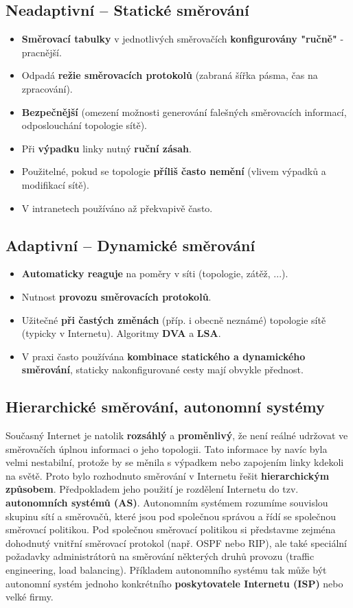 \subsection{Neadaptivní -- Statické směrování}
\begin{itemize}
    \item \textbf{Směrovací tabulky} v jednotlivých směrovačích \textbf{konfigurovány "ručně"} - pracnější.
    \item Odpadá \textbf{režie směrovacích protokolů} (zabraná šířka pásma, čas na zpracování).
    \item \textbf{Bezpečnější} (omezení možnosti generování falešných směrovacích informací, odposlouchání topologie sítě).
    \item Při \textbf{výpadku} linky nutný \textbf{ruční zásah}.
    \item Použitelné, pokud se topologie \textbf{příliš často nemění} (vlivem výpadků a modifikací sítě).
    \item V intranetech používáno až překvapivě často.
\end{itemize}

\subsection{Adaptivní -- Dynamické směrování}
\begin{itemize}
    \item \textbf{Automaticky reaguje} na poměry v síti (topologie, zátěž, ...).
    \item Nutnost\textbf{ provozu směrovacích protokolů}.
    \item Užitečné \textbf{při častých změnách} (příp. i obecně neznámé) topologie sítě (typicky v Internetu). Algoritmy \textbf{DVA} a \textbf{LSA}.
    \item V praxi často používána \textbf{kombinace statického a dynamického směrování}, staticky nakonfigurované cesty mají obvykle přednost.
\end{itemize}

\subsection{Hierarchické směrování, autonomní systémy}
Současný Internet je natolik \textbf{rozsáhlý} a \textbf{proměnlivý}, že není reálné udržovat ve směrovačích úplnou informaci o jeho topologii. Tato informace by navíc byla velmi nestabilní, protože by se měnila s výpadkem nebo zapojením linky kdekoli na světě. Proto bylo rozhodnuto směrování v Internetu řešit \textbf{hierarchickým způsobem}. Předpokladem jeho použití je rozdělení Internetu do tzv. \textbf{autonomních systémů (AS)}. Autonomním systémem rozumíme souvislou skupinu sítí a směrovačů, které jsou pod společnou správou a řídí se společnou směrovací politikou. Pod společnou směrovací politikou si představme zejména dohodnutý vnitřní směrovací protokol (např. OSPF nebo RIP), ale také speciální požadavky administrátorů na směrování některých druhů provozu (traffic engineering, load balancing). Příkladem autonomního systému tak může být autonomní systém jednoho konkrétního\textbf{ poskytovatele Internetu (ISP)} nebo velké firmy.

